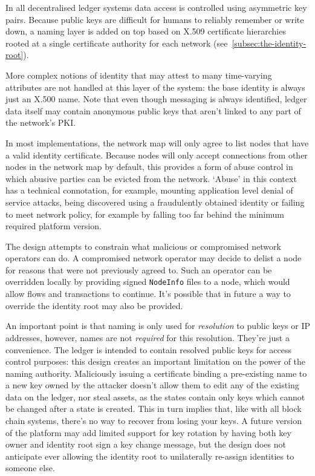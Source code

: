 \documentclass{article}
\begin{document}
In all decentralised ledger systems data access is controlled using asymmetric key pairs. Because public keys are
difficult for humans to reliably remember or write down, a naming layer is added on top based on X.509 certificate
hierarchies rooted at a single certificate authority for each network (see~\cref{subsec:the-identity-root}).

More complex notions of identity that may attest to many time-varying attributes are not handled at this layer of
the system: the base identity is always just an X.500 name. Note that even though messaging is always identified,
ledger data itself may contain anonymous public keys that aren't linked to any part of the network's PKI.

In most implementations, the network map will only agree to list nodes that have a valid identity certificate.
Because nodes will only accept connections from other nodes in the network map by default, this provides a form of
abuse control in which abusive parties can be evicted from the network. `Abuse' in this context has a technical
connotation, for example, mounting application level denial of service attacks, being discovered using a
fraudulently obtained identity or failing to meet network policy, for example by falling too far behind the
minimum required platform version.

The design attempts to constrain what malicious or compromised network operators can do.  A compromised network
operator may decide to delist a node for reasons that were not previously agreed to. Such an operator can be
overridden locally by providing signed \texttt{NodeInfo} files to a node, which would allow flows and transactions
to continue. It's possible that in future a way to override the identity root may also be provided.

An important point is that naming is only used for \emph{resolution} to public keys or IP addresses, however, names
are not \emph{required} for this resolution. They're just a convenience. The ledger is intended to contain resolved
public keys for access control purposes: this design creates an important limitation on the power of the naming
authority. Maliciously issuing a certificate binding a pre-existing name to a new key owned by the attacker doesn't
allow them to edit any of the existing data on the ledger, nor steal assets, as the states contain only keys which
cannot be changed after a state is created. This in turn implies that, like with all block chain systems, there's
no way to recover from losing your keys. A future version of the platform may add limited support for key rotation
by having both key owner and identity root sign a key change message, but the design does not anticipate ever
allowing the identity root to unilaterally re-assign identities to someone else.
\end{document}
